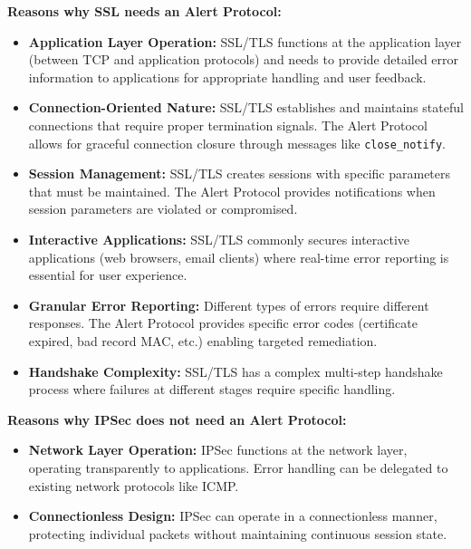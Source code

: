 \documentclass[11pt]{article}
\begin{document}
\begin{description}
    \textbf{Reasons why SSL needs an Alert Protocol:}
    \begin{itemize}
        \item \textbf{Application Layer Operation:} SSL/TLS functions at the application layer (between TCP and application protocols) and needs to provide detailed error information to applications for appropriate handling and user feedback.
        
        \item \textbf{Connection-Oriented Nature:} SSL/TLS establishes and maintains stateful connections that require proper termination signals. The Alert Protocol allows for graceful connection closure through messages like \texttt{close\_notify}.
        
        \item \textbf{Session Management:} SSL/TLS creates sessions with specific parameters that must be maintained. The Alert Protocol provides notifications when session parameters are violated or compromised.
        
        \item \textbf{Interactive Applications:} SSL/TLS commonly secures interactive applications (web browsers, email clients) where real-time error reporting is essential for user experience.
        
        \item \textbf{Granular Error Reporting:} Different types of errors require different responses. The Alert Protocol provides specific error codes (certificate expired, bad record MAC, etc.) enabling targeted remediation.
        
        \item \textbf{Handshake Complexity:} SSL/TLS has a complex multi-step handshake process where failures at different stages require specific handling.
    \end{itemize}
    
    \textbf{Reasons why IPSec does not need an Alert Protocol:}
    \begin{itemize}
        \item \textbf{Network Layer Operation:} IPSec functions at the network layer, operating transparently to applications. Error handling can be delegated to existing network protocols like ICMP.
        
        \item \textbf{Connectionless Design:} IPSec can operate in a connectionless manner, protecting individual packets without maintaining continuous session state.
        

\end{itemize}
\end{description}
\end{document}

